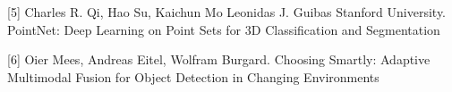 \documentclass{article}
\begin{document}
[5] Charles R. Qi, Hao Su, Kaichun Mo Leonidas J. Guibas Stanford University. PointNet: Deep Learning on Point Sets for 3D Classification and Segmentation

[6] Oier Mees, Andreas Eitel, Wolfram Burgard. Choosing Smartly: Adaptive Multimodal Fusion for Object Detection in Changing Environments




%
%
%
\end{document}
